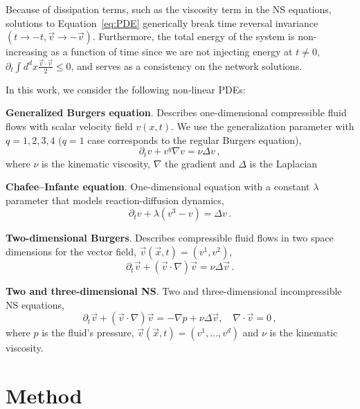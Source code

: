 \documentclass{article}
\theoremstyle{plain}
\theoremstyle{definition}
\theoremstyle{remark}
\begin{document}
Because of dissipation terms, such as the viscosity term in the NS equations, solutions to Equation~\eqref{eq:PDE} generically break time reversal invariance $(t\rightarrow -t, \vec{v}\rightarrow -\vec{v})$.
Furthermore, the total energy of the system is non-increasing as a function of time since we are not injecting energy at $t\neq 0$, $\partial_t \int d^d x \frac{\vec{v}\cdot\vec{v}}{2}  \leq 0 $, and serves as a consistency on the network solutions.


In this work, we consider the following non-linear PDEs:

 
 {\bf Generalized Burgers equation}. Describes one-dimensional compressible fluid flows with scalar velocity field $v(x,t)$. We use the generalization parameter with $q=1,2,3,4$ ($q=1$ case corresponds to the regular Burgers equation),
     \begin{equation}
         \partial_t v + v^q\nabla v = \nu \Delta v \,,
     \end{equation} 
 where $\nu$ is the kinematic viscosity, $\nabla$ the gradient and $\Delta$ is the Laplacian
 
 {\bf  Chafee–Infante equation}. One-dimensional equation with a constant $\lambda$ parameter that models reaction-diffusion dynamics,
     \begin{equation}
         \partial_t v + \lambda (v^3 - v) = \Delta v \,.
     \end{equation} 
     
 {\bf Two-dimensional Burgers}. Describes compressible fluid flows in two space dimensions
 for the vector field, $\vec{v}(\vec{x},t) = (v^1,v^2)$,
     \begin{equation}
         \partial_t \vec{v} + (\vec{v}\cdot \nabla) \vec{v} = \nu \Delta \vec{v} \,.
     \end{equation}
 
 {\bf Two and three-dimensional NS}. Two and three-dimensional incompressible NS equations,
     \begin{equation}
         \partial_t \vec{v} + (\vec{v} \cdot  \nabla) \vec{v} = -\nabla p + \nu \Delta \vec{v},\quad \nabla\cdot \vec{v} = 0 \,,
     \end{equation}
     where $p$ is the fluid's pressure, $\vec{v}(\vec{x},t) = (v^1,\dots,v^d)$ and
     $\nu$ is the kinematic viscosity.
 


\section{Method}
\end{document}
